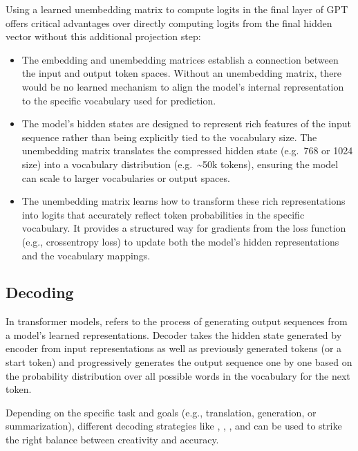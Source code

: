 \documentclass[letterpaper,11pt,english]{sphinxmanual}
\begin{document}
\sphinxAtStartPar
Using a learned unembedding matrix to compute logits in the final layer
of GPT offers critical advantages over directly computing logits from
the final hidden vector without this additional projection step:
\begin{itemize}
\item {} 
\sphinxAtStartPar
The embedding and unembedding matrices establish a connection between
the input and output token spaces. Without an unembedding matrix,
there would be no learned mechanism to align the model’s internal
representation to the specific vocabulary used for prediction.

\item {} 
\sphinxAtStartPar
The model’s hidden states are designed to represent rich features of
the input sequence rather than being explicitly tied to the vocabulary
size. The unembedding matrix translates the compressed hidden state
(e.g. 768 or 1024 size) into a vocabulary distribution (e.g. \textasciitilde{}50k
tokens), ensuring the model can scale to larger vocabularies or output
spaces.

\item {} 
\sphinxAtStartPar
The unembedding matrix learns how to transform these rich
representations into logits that accurately reflect token
probabilities in the specific vocabulary. It provides a structured way
for gradients from the loss function (e.g., cross\sphinxhyphen{}entropy loss) to
update both the model’s hidden representations and the vocabulary
mappings.

\end{itemize}


\subsection{Decoding}
\label{\detokenize{pretraining:decoding}}
\sphinxAtStartPar
In transformer models,  refers to the process of generating
output sequences from a model’s learned representations. Decoder takes
the hidden state generated by encoder from input representations as well
as previously generated tokens (or a start token) and progressively
generates the output sequence one by one based on the probability
distribution over all possible words in the vocabulary for the next
token.

\sphinxAtStartPar
Depending on the specific task and goals (e.g., translation, generation,
or summarization), different decoding strategies like ,
, , and  can
be used to strike the right balance between creativity and accuracy.
\end{document}
